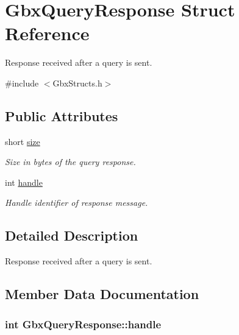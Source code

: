 \hypertarget{structGbxQueryResponse}{\section{Gbx\-Query\-Response Struct Reference}
\label{structGbxQueryResponse}
}


Response received after a query is sent.  




{\ttfamily \#include $<$Gbx\-Structs.\-h$>$}

\subsection*{Public Attributes}
\begin{DoxyCompactItemize}
\item 
short \hyperlink{structGbxQueryResponse_ab7d7e30d6beb443cdae8cbf95e4c89f3}{size}
\begin{DoxyCompactList}\small\item\em Size in bytes of the query response. \end{DoxyCompactList}\item 
int \hyperlink{structGbxQueryResponse_a0f13a7b1745dcf1f7e17c0bc3a0acecb}{handle}
\begin{DoxyCompactList}\small\item\em Handle identifier of response message. \end{DoxyCompactList}\end{DoxyCompactItemize}


\subsection{Detailed Description}
Response received after a query is sent. 

\subsection{Member Data Documentation}
\hypertarget{structGbxQueryResponse_a0f13a7b1745dcf1f7e17c0bc3a0acecb}{
\subsubsection[{handle}]{\setlength{\rightskip}{0pt plus 5cm}int Gbx\-Query\-Response\-::handle}}\label{structGbxQueryResponse_a0f13a7b1745dcf1f7e17c0bc3a0acecb}


